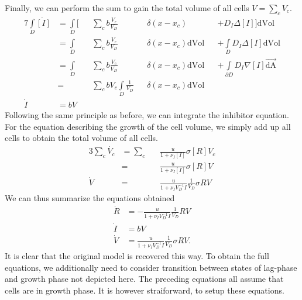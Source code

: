 \documentclass[10pt,twocolumn,5p]{elsarticle}
\numberwithin{equation}{section}
\begin{document}
Finally, we can perform the sum to gain the total volume of all cells $V=\sum\limits_c V_c$.
\begin{alignat}{7}
    \int\limits_D\dot{[I]} &= \int\limits_D \bigg[&&\sum\limits_c b\frac{V_c}{V_D}&&\delta(x-x_c) &&+ D_I\Delta [I]\bigg]\text{dVol}\\
    &= \int\limits_D&&\sum\limits_c b\frac{V_c}{V_D}&&\delta(x-x_c) \text{dVol} &&+ \int\limits_D D_I\Delta [I]\text{dVol}\\
    &= \int\limits_D&&\sum\limits_c b\frac{V_c}{V_D}&&\delta(x-x_c) \text{dVol} &&+ \int\limits_{\partial D} D_I\nabla [I]\vec{\text{dA}}\\
    &= &&\sum\limits_c b V_c\int\limits_D \frac{1}{V_D} &&\delta(x-x_c) \text{dVol}\\
    \dot{I} &= b V
\end{alignat}
Following the same principle as before, we can integrate the inhibitor equation.
For the equation describing the growth of the cell volume, we simply add up all cells to obtain the total volume of all cells.
\begin{alignat}{3}
    \sum\limits_c\dot{V_c}
    &= \sum\limits_c&&\frac{u}{1+\nu_I [I]} \sigma [R]V_c\\
    &= &&\frac{u}{1+\nu_I [I]} \sigma [R]V\\
    \dot{V} &= &&\frac{u}{1+\nu_I V_D^{-1} I} \frac{1}{V_D}\sigma R V
\end{alignat}
We can thus summarize the equations obtained
\begin{align}
    \dot{R} &= -\frac{u}{1+\nu_I V_D^{-1}I} \frac{1}{V_D} R V\\
    \dot{I} &= b V\\
    \dot{V} &= \frac{u}{1+\nu_I V_D^{-1} I} \frac{1}{V_D}\sigma R V.
\end{align}
It is clear that the original model is recovered this way.
To obtain the full equations, we additionally need to consider transition between states of lag-phase and growth phase not depicted here.
The preceding equations all assume that cells are in growth phase.
It is however straiforward, to setup these equations.
%
%
\end{document}
